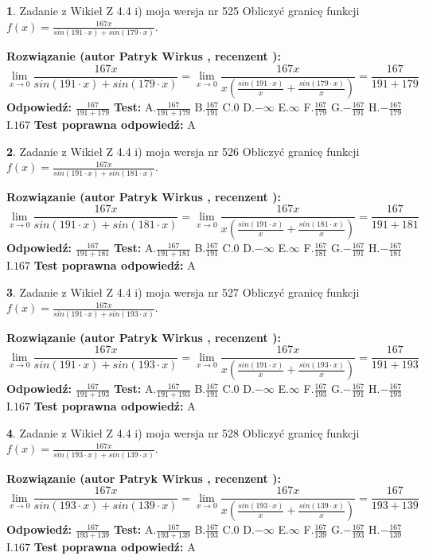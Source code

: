 \documentclass[12pt, a4paper]{article}
\theoremstyle{definition} %
\newtheorem{zad}{}
\newcommand{\zadStart}[1]{\begin{zad}#1\newline}
\newcommand{\zadStop}{\end{zad}}
\newcommand{\rozwStart}[2]{\noindent \textbf{Rozwiązanie (autor #1 , recenzent #2): }\newline}
\newcommand{\rozwStop}{\newline}
\newcommand{\odpStart}{\noindent \textbf{Odpowiedź:}\newline}
\newcommand{\odpStop}{\newline}
\newcommand{\testStart}{\noindent \textbf{Test:}\newline}
\newcommand{\testStop}{\newline}
\newcommand{\kluczStart}{\noindent \textbf{Test poprawna odpowiedź:}\newline}
\newcommand{\kluczStop}{\newline}
\begin{document}
\zadStart{Zadanie z Wikieł Z 4.4 i) moja wersja nr 525}
Obliczyć granicę funkcji $f(x)=\frac{167x}{sin(191\cdot x) +sin(179\cdot x)}$.
\zadStop
\rozwStart{Patryk Wirkus}{}
$$\lim\limits_{x\to 0}\frac{167x}{sin(191\cdot x) +sin(179\cdot x)}=\lim\limits_{x\to 0}\frac{167x}{x(\frac{sin(191\cdot x)}{x}+\frac{sin(179\cdot x)}{x})}=\frac{167}{191+179}$$
\rozwStop
\odpStart
$\frac{167}{191+179}$
\odpStop
\testStart
A.$\frac{167}{191+179}$
B.$\frac{167}{191}$
C.$0$
D.$-\infty$
E.$\infty$
F.$\frac{167}{179}$
G.$-\frac{167}{191}$
H.$-\frac{167}{179}$
I.$167$
\testStop
\kluczStart
A
\kluczStop



\zadStart{Zadanie z Wikieł Z 4.4 i) moja wersja nr 526}
Obliczyć granicę funkcji $f(x)=\frac{167x}{sin(191\cdot x) +sin(181\cdot x)}$.
\zadStop
\rozwStart{Patryk Wirkus}{}
$$\lim\limits_{x\to 0}\frac{167x}{sin(191\cdot x) +sin(181\cdot x)}=\lim\limits_{x\to 0}\frac{167x}{x(\frac{sin(191\cdot x)}{x}+\frac{sin(181\cdot x)}{x})}=\frac{167}{191+181}$$
\rozwStop
\odpStart
$\frac{167}{191+181}$
\odpStop
\testStart
A.$\frac{167}{191+181}$
B.$\frac{167}{191}$
C.$0$
D.$-\infty$
E.$\infty$
F.$\frac{167}{181}$
G.$-\frac{167}{191}$
H.$-\frac{167}{181}$
I.$167$
\testStop
\kluczStart
A
\kluczStop



\zadStart{Zadanie z Wikieł Z 4.4 i) moja wersja nr 527}
Obliczyć granicę funkcji $f(x)=\frac{167x}{sin(191\cdot x) +sin(193\cdot x)}$.
\zadStop
\rozwStart{Patryk Wirkus}{}
$$\lim\limits_{x\to 0}\frac{167x}{sin(191\cdot x) +sin(193\cdot x)}=\lim\limits_{x\to 0}\frac{167x}{x(\frac{sin(191\cdot x)}{x}+\frac{sin(193\cdot x)}{x})}=\frac{167}{191+193}$$
\rozwStop
\odpStart
$\frac{167}{191+193}$
\odpStop
\testStart
A.$\frac{167}{191+193}$
B.$\frac{167}{191}$
C.$0$
D.$-\infty$
E.$\infty$
F.$\frac{167}{193}$
G.$-\frac{167}{191}$
H.$-\frac{167}{193}$
I.$167$
\testStop
\kluczStart
A
\kluczStop



\zadStart{Zadanie z Wikieł Z 4.4 i) moja wersja nr 528}
Obliczyć granicę funkcji $f(x)=\frac{167x}{sin(193\cdot x) +sin(139\cdot x)}$.
\zadStop
\rozwStart{Patryk Wirkus}{}
$$\lim\limits_{x\to 0}\frac{167x}{sin(193\cdot x) +sin(139\cdot x)}=\lim\limits_{x\to 0}\frac{167x}{x(\frac{sin(193\cdot x)}{x}+\frac{sin(139\cdot x)}{x})}=\frac{167}{193+139}$$
\rozwStop
\odpStart
$\frac{167}{193+139}$
\odpStop
\testStart
A.$\frac{167}{193+139}$
B.$\frac{167}{193}$
C.$0$
D.$-\infty$
E.$\infty$
F.$\frac{167}{139}$
G.$-\frac{167}{193}$
H.$-\frac{167}{139}$
I.$167$
\testStop
\kluczStart
A
\kluczStop
\end{document}
